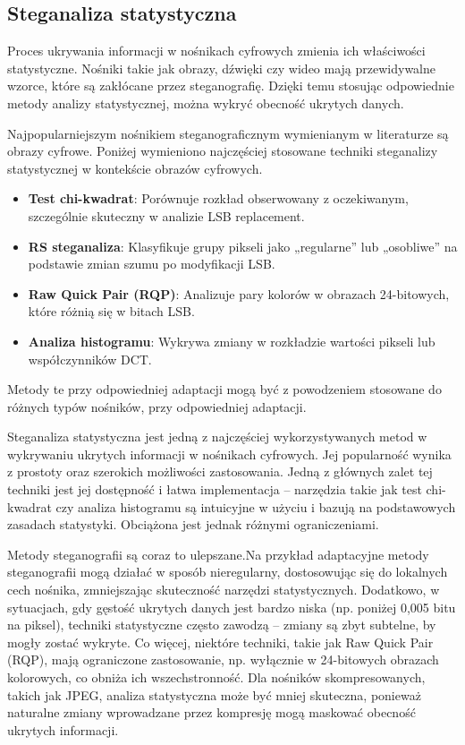 \subsection{Steganaliza statystyczna}

Proces ukrywania informacji w nośnikach cyfrowych zmienia ich właściwości statystyczne. Nośniki takie jak 
obrazy, dźwięki czy wideo mają przewidywalne wzorce, które są zakłócane przez steganografię. Dzięki temu 
stosując odpowiednie metody analizy statystycznej, można wykryć obecność ukrytych danych.


Najpopularniejszym nośnikiem steganograficznym wymienianym w literaturze są obrazy cyfrowe. Poniżej wymieniono 
najczęściej stosowane techniki steganalizy statystycznej w kontekście obrazów cyfrowych.
\begin{itemize}
    \item \textbf{Test chi-kwadrat}: Porównuje rozkład obserwowany z oczekiwanym, szczególnie skuteczny w analizie LSB replacement.
    \item \textbf{RS steganaliza}: Klasyfikuje grupy pikseli jako „regularne” lub „osobliwe” na podstawie zmian szumu po modyfikacji LSB.
    \item \textbf{Raw Quick Pair (RQP)}: Analizuje pary kolorów w obrazach 24-bitowych, które różnią się w bitach LSB.
    \item \textbf{Analiza histogramu}: Wykrywa zmiany w rozkładzie wartości pikseli lub współczynników DCT.
\end{itemize}

Metody te przy odpowiedniej adaptacji mogą być z powodzeniem stosowane do różnych typów nośników, przy odpowiedniej adaptacji.


Steganaliza statystyczna jest jedną z najczęściej wykorzystywanych metod w wykrywaniu ukrytych informacji 
w nośnikach cyfrowych. Jej popularność wynika z prostoty oraz szerokich możliwości zastosowania. Jedną 
z głównych zalet tej techniki jest jej dostępność i łatwa implementacja – narzędzia takie jak test 
chi-kwadrat czy analiza histogramu są intuicyjne w użyciu i bazują na podstawowych zasadach statystyki. 
Obciążona jest jednak różnymi ograniczeniami.

Metody steganografii są coraz to ulepszane.Na przykład adaptacyjne metody steganografii mogą działać 
w sposób nieregularny, dostosowując się do lokalnych cech nośnika, zmniejszając skuteczność narzędzi 
statystycznych. Dodatkowo, w sytuacjach, gdy gęstość ukrytych danych jest bardzo niska (np. poniżej 0,005 
bitu na piksel), techniki statystyczne często zawodzą -- zmiany są zbyt subtelne, by mogły zostać 
wykryte. Co więcej, niektóre techniki, takie jak Raw Quick Pair (RQP), mają 
ograniczone zastosowanie, np. wyłącznie w 24-bitowych obrazach kolorowych, co obniża ich wszechstronność. 
Dla nośników skompresowanych, takich jak JPEG, analiza statystyczna może być mniej skuteczna, ponieważ 
naturalne zmiany wprowadzane przez kompresję mogą maskować obecność ukrytych informacji.

